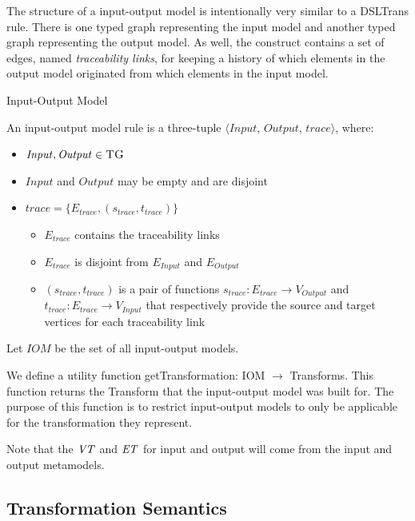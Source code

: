 The structure of a input-output model is intentionally very similar to a DSLTrans rule. There is one typed graph representing the input model and another typed graph representing the output model. As well, the construct contains a set of edges, named \emph{traceability links}, for keeping a history of which elements in the output model originated from which elements in the input model.

\begin{definition}{Input-Output Model\\}
\label{def:input_output_model}

An input-output model rule is a three-tuple $\big\langle \mathit{Input}$, $\mathit{Output}$, $\mathit{trace}\big\rangle$, where:

\begin{itemize}
\item $\mathit{Input}, \mathit{Output} \in \textsc{TG}$
\item $\mathit{Input}$ and $\mathit{Output} $ may be empty and are disjoint
\item $\mathit{trace} = \{E_{trace}, (s_{trace}, t_{trace})\}$
\begin{itemize}
\item $E_{trace}$ contains the traceability links
\item $E_{trace} $ is disjoint from $E_{Input}$ and $E_{Output}$
\item $(s_{trace}, t_{trace})$ is a pair of functions $s_{trace}: E_{trace}\rightarrow V_{\textit{Output}}$ and $t_{trace}: E_{trace}\rightarrow V_{\textit{Input}}$ that respectively provide the source and target vertices for each traceability link
\end{itemize}

\end{itemize}  

Let $\mathit{IOM}$ be the set of all input-output models.

We define a utility function getTransformation: IOM $\rightarrow$ Transforms. This function returns the Transform that the input-output model was built for. The purpose of this function is to restrict input-output models to only be applicable for the transformation they represent.

Note that the $\mathit{VT}$ and $\mathit{ET}$ for input and output will come from the input and output metamodels.  

\end{definition}


\subsection{Transformation Semantics}
\label{sec:DSLTrans_semantics}

